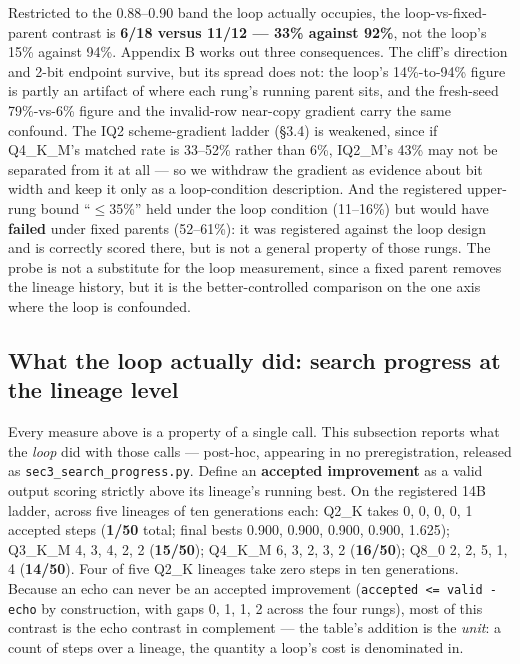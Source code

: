 Restricted to the 0.88--0.90 band the loop actually occupies, the loop-vs-fixed-parent contrast is \textbf{6/18 versus 11/12 --- 33\% against 92\%}, not the loop's 15\% against 94\%. Appendix B works out three consequences. The cliff's direction and 2-bit endpoint survive, but its spread does not: the loop's 14\%-to-94\% figure is partly an artifact of where each rung's running parent sits, and the fresh-seed 79\%-vs-6\% figure and the invalid-row near-copy gradient carry the same confound. The IQ2 scheme-gradient ladder (\S3.4) is weakened, since if Q4\_K\_M's matched rate is 33--52\% rather than 6\%, IQ2\_M's 43\% may not be separated from it at all --- so we withdraw the gradient as evidence about bit width and keep it only as a loop-condition description. And the registered upper-rung bound ``$\le$35\%'' held under the loop condition (11--16\%) but would have \textbf{failed} under fixed parents (52--61\%): it was registered against the loop design and is correctly scored there, but is not a general property of those rungs. The probe is not a substitute for the loop measurement, since a fixed parent removes the lineage history, but it is the better-controlled comparison on the one axis where the loop is confounded.

\subsection{What the loop actually did: search progress at the lineage level}

Every measure above is a property of a single call. This subsection reports what the \emph{loop} did with those calls --- post-hoc, appearing in no preregistration, released as \texttt{sec3\_search\_progress.py}. Define an \textbf{accepted improvement} as a valid output scoring strictly above its lineage's running best. On the registered 14B ladder, across five lineages of ten generations each: Q2\_K takes 0, 0, 0, 0, 1 accepted steps (\textbf{1/50} total; final bests 0.900, 0.900, 0.900, 0.900, 1.625); Q3\_K\_M 4, 3, 4, 2, 2 (\textbf{15/50}); Q4\_K\_M 6, 3, 2, 3, 2 (\textbf{16/50}); Q8\_0 2, 2, 5, 1, 4 (\textbf{14/50}). Four of five Q2\_K lineages take zero steps in ten generations. Because an echo can never be an accepted improvement (\texttt{accepted <= valid - echo} by construction, with gaps 0, 1, 1, 2 across the four rungs), most of this contrast is the echo contrast in complement --- the table's addition is the \emph{unit}: a count of steps over a lineage, the quantity a loop's cost is denominated in.

